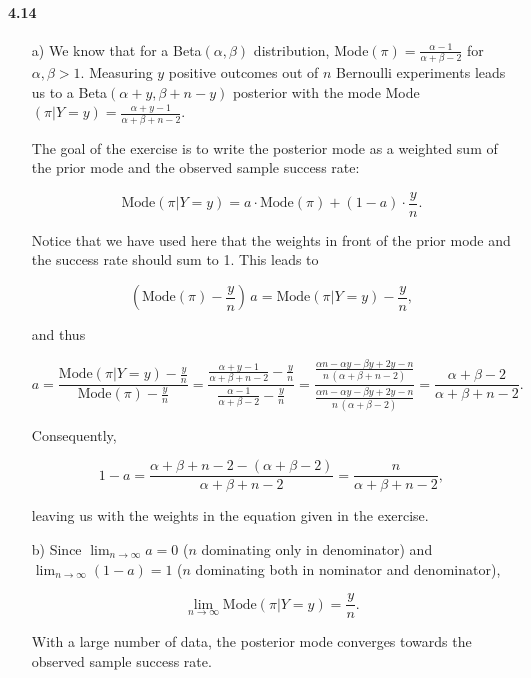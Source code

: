 \documentclass[fontsize=11pt,DIV=18,parskip=half]{scrartcl}
\begin{document}
\paragraph{4.14}
\begin{enumerate}
\item[a)] We know that for a Beta$(\alpha, \beta)$ distribution, Mode$(\pi) = \frac{\alpha-1}{\alpha+\beta-2}$ for $\alpha, \beta > 1$. Measuring $y$ positive outcomes out of $n$ Bernoulli experiments leads us to a Beta$(\alpha+y, \beta+n-y)$ posterior with the mode Mode$(\pi|Y=y) = \frac{\alpha+y-1}{\alpha+\beta+n-2}$.

The goal of the exercise is to write the posterior mode as a weighted sum of the prior mode and the observed sample success rate:

\begin{equation*}
\text{Mode}(\pi|Y=y) = a \cdot \text{Mode}(\pi) + (1-a) \cdot \frac{y}{n}.
\end{equation*}

Notice that we have used here that the weights in front of the prior mode and the success rate should sum to 1. This leads to

\begin{equation*}
\left( \text{Mode}(\pi) - \frac{y}n \right) \, a = \text{Mode}(\pi|Y=y) - \frac{y}{n},
\end{equation*}

and thus

\begin{equation*}
a = \frac{ \text{Mode}(\pi|Y=y) - \frac{y}{n}}{\text{Mode}(\pi) - \frac{y}n} = \frac{\frac{\alpha+y-1}{\alpha+\beta+n-2} - \frac{y}{n}}{\frac{\alpha-1}{\alpha+\beta-2} - \frac{y}{n}} = \frac{\frac{\alpha n - \alpha y - \beta y + 2y - n}{n \, (\alpha + \beta + n - 2)}}{\frac{\alpha n - \alpha y - \beta y + 2y - n}{n\,(\alpha+\beta-2)}} = \frac{\alpha+\beta-2}{\alpha+\beta+n-2}.
\end{equation*}

Consequently,

\begin{equation*}
1-a = \frac{\alpha+\beta+n-2 - (\alpha+\beta-2) }{\alpha+\beta+n-2} = \frac{n}{\alpha+\beta+n-2},
\end{equation*}

leaving us with the weights in the equation given in the exercise.

\item[b)] Since $\displaystyle{\lim_{n\to\infty}} a = 0$ ($n$ dominating only in denominator) and $\displaystyle{\lim_{n\to\infty}} (1-a) = 1$ ($n$ dominating both in nominator and denominator), 

\begin{equation*}
\lim_{n\to\infty} \text{Mode}(\pi|Y=y) = \frac{y}{n}.
\end{equation*}

With a large number of data, the posterior mode converges towards the observed sample success rate.
\end{enumerate}
\end{document}
